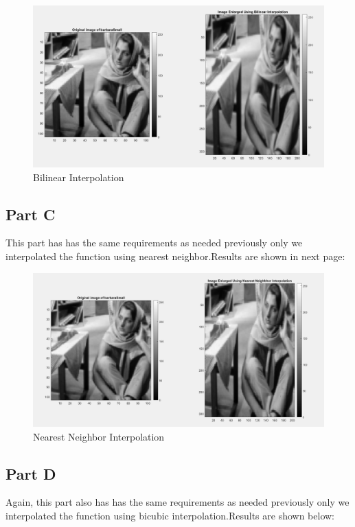 \documentclass[12pt, a4paper]{article}
\begin{document}
\begin{figure}[h!]
  \centering
    \includegraphics[scale=0.4]{bilinear.png}
    \caption{Bilinear Interpolation}
  \label{fig:3}
\end{figure}

\subsection*{Part C}
This part has has the same requirements as needed previously only we interpolated the function using nearest neighbor.Results are shown in next page:

\begin{figure}[h!]
  \centering
    \includegraphics[scale=0.4]{nearest_neighbor.png}
    \caption{Nearest Neighbor Interpolation}
  \label{fig:4}
\end{figure}

\clearpage

\subsection*{Part D}
Again, this part also has has the same requirements as needed previously only we interpolated the function using bicubic interpolation.Results are shown below:
\end{document}
